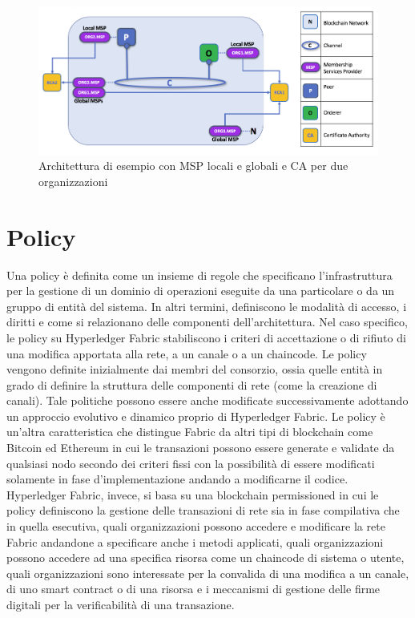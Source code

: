 \begin{figure}[h]
    \centering
    \includegraphics[width=1\textwidth]{img/MSP.png}
    \caption{Architettura di esempio con MSP locali e globali e CA per due organizzazioni}
    \label{fig:msp}
\end{figure}
\newpage
\section{Policy}
Una policy è definita come un insieme di regole che specificano l'infrastruttura per la gestione di un dominio di operazioni eseguite da una particolare o da un gruppo di entità del sistema. In altri termini, definiscono le modalità di accesso, i diritti e come si relazionano delle componenti dell'architettura. Nel caso specifico, le policy su Hyperledger Fabric stabiliscono i criteri di accettazione o di rifiuto di una modifica apportata alla rete, a un canale o a un chaincode. Le policy vengono definite inizialmente dai membri del consorzio, ossia quelle entità in grado di definire la struttura delle componenti di rete (come la creazione di canali). Tale politiche possono essere anche modificate successivamente adottando un approccio evolutivo e dinamico proprio di Hyperledger Fabric.
Le policy è un'altra caratteristica che distingue Fabric da altri tipi di blockchain come Bitcoin ed Ethereum in cui le transazioni possono essere generate e validate da qualsiasi nodo secondo dei criteri fissi con la possibilità di essere modificati solamente in fase d'implementazione andando a modificarne il codice. Hyperledger Fabric, invece, si basa su una blockchain permissioned in cui le policy definiscono la gestione delle transazioni di rete sia in fase compilativa che in quella esecutiva, quali organizzazioni possono accedere e modificare la rete Fabric andandone a specificare anche i metodi applicati, quali organizzazioni possono accedere ad una specifica risorsa come un chaincode di sistema o utente, quali organizzazioni sono interessate per la convalida di una modifica a un canale, di uno smart contract o di una risorsa e i meccanismi di gestione delle firme digitali per la verificabilità di una transazione.
\newpage
